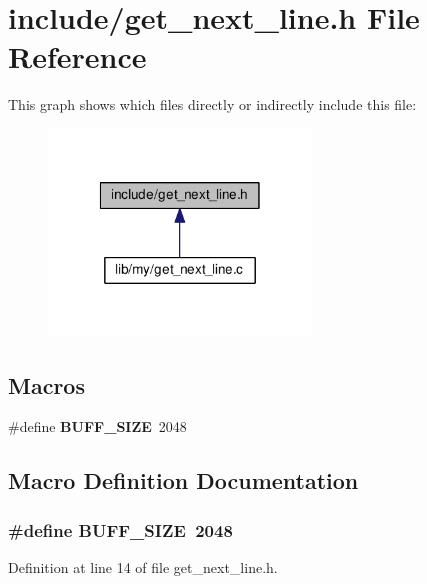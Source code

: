 \section{include/get\-\_\-next\-\_\-line.h File Reference}
\label{get__next__line_8h}
This graph shows which files directly or indirectly include this file\-:\nopagebreak
\begin{figure}[H]
\begin{center}
\leavevmode
\includegraphics[width=198pt]{get__next__line_8h__dep__incl}
\end{center}
\end{figure}
\subsection*{Macros}
\begin{DoxyCompactItemize}
\item 
\#define {\bf B\-U\-F\-F\-\_\-\-S\-I\-Z\-E}~2048
\end{DoxyCompactItemize}


\subsection{Macro Definition Documentation}
\subsubsection[{B\-U\-F\-F\-\_\-\-S\-I\-Z\-E}]{\setlength{\rightskip}{0pt plus 5cm}\#define B\-U\-F\-F\-\_\-\-S\-I\-Z\-E~2048}\label{get__next__line_8h_a6c7cd32e1bac137f05e4a752b4ad10af}


Definition at line 14 of file get\-\_\-next\-\_\-line.\-h.

